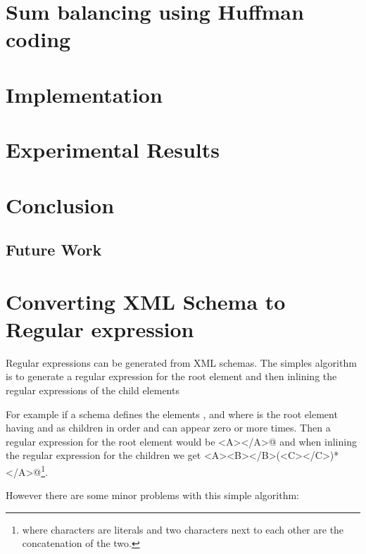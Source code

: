 \documentclass[a4paper, oneside]{memoir}
\theoremstyle{definition}
\begin{document}
\section{Sum balancing using Huffman coding}\label{sec:sum-balancing-using}

\section{Implementation}

\section{Experimental Results}

\section{Conclusion}

\subsection{Future Work}


\section{Converting XML Schema to Regular expression}

Regular expressions can be generated from XML schemas. The simples algorithm is
to generate a regular expression for the root element and then inlining the
regular expressions of the child elements

For example if a schema defines the elements \verb@A@, \verb@B@ and \verb@C@
where \verb@A@ is the root element having \verb@B@ and \verb@C@ as children in
order and \verb@C@ can appear zero or more times. Then a regular expression for
the root element would be \verb@<A></A>@ and when inlining the regular
expression for the children we get
\verb@<A><B></B>(<C></C>)*</A>@\footnote{where characters are literals and two
  characters next to each other are the concatenation of the two.}.
  
  However there are some minor problems with this simple algorithm:
\end{document}
